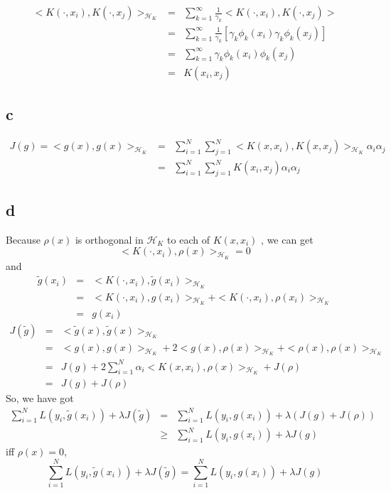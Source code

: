 \documentclass[11pt, oneside]{article}   	%
\begin{document}
\begin{eqnarray}
<K(\cdot, x_i), K(\cdot, x_j)>_{\mathcal{H}_K} &=& \sum_{k=1}^{\infty} \frac{1}{\gamma_k} <K(\cdot, x_i), K(\cdot, x_j)>\\
&=& \sum_{k=1}^{\infty} \frac{1}{\gamma_k} [\gamma_k \phi_k(x_i) \gamma_k \phi_k(x_j)]\\
&=& \sum_{k=1}^{\infty}\gamma_k \phi_k(x_i) \phi_k(x_j)\\
&=& K(x_i, x_j)
\end{eqnarray}

\subsection{c}
\begin{eqnarray}
J(g) = <g(x), g(x)>_{\mathcal{H}_K} &=& \sum_{i=1}^{N}\sum_{j=1}^{N} <K(x, x_i), K(x, x_j)>_{\mathcal{H}_K} \alpha_i \alpha_j \\
&=& \sum_{i=1}^{N}\sum_{j=1}^{N} K(x_i, x_j) \alpha_i \alpha_j
\end{eqnarray}

\subsection{d}

Because $\rho(x)$ is orthogonal in 
$\mathcal{H}_K$ to each of 
$K (x, x_i )$ , we can get 
\begin{equation}
<K (\cdot, x_i ), \rho(x)>_{\mathcal{H}_K} = 0
\end{equation}
and 
\begin{eqnarray}
\tilde{g}(x_i) &=& <K(\cdot, x_i), \tilde{g}(x_i)>_{\mathcal{H}_K}\\
&=& <K(\cdot, x_i), g(x_i)>_{\mathcal{H}_K}+ <K(\cdot, x_i), \rho(x_i)>_{\mathcal{H}_K}\\
&=& {g}(x_i)
\end{eqnarray}
\begin{eqnarray}
J(\tilde{g}) &=& <\tilde{g}(x), \tilde{g}(x)>_{\mathcal{H}_K}\\
&=& <{g}(x), g(x)>_{\mathcal{H}_K} + 2<{g}(x), \rho(x)>_{\mathcal{H}_K} + < \rho(x), \rho(x)>_{\mathcal{H}_K}\\
&=& J(g) + 2 \sum_{i=1}^{N} \alpha_i <K(x, x_i), \rho(x)>_{\mathcal{H}_K} + J(\rho)\\
&=& J(g) + J(\rho)
\end{eqnarray} 
So, we have got 
\begin{eqnarray}
\sum_{i=1}^{N} L(y_i, \tilde{g}(x_i)) + \lambda J(\tilde{g}) &=& \sum_{i=1}^{N} L(y_i, {g}(x_i)) + \lambda (J(g) + J(\rho))\\
&\ge& \sum_{i=1}^{N} L(y_i, {g}(x_i)) + \lambda J(g)
\end{eqnarray} 
iff $\rho(x) = 0$, 
\begin{equation}
\sum_{i=1}^{N} L(y_i, \tilde{g}(x_i)) + \lambda J(\tilde{g}) = \sum_{i=1}^{N} L(y_i, {g}(x_i)) + \lambda J(g)
\end{equation}
\end{document}
